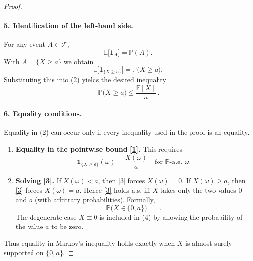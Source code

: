 \begin{proof}
\paragraph{5. Identification of the left‑hand side.}  
For any event \(A\in\mathcal{F}\),
\[
\mathbb{E}\bigl[\mathbf{1}_{A}\bigr]=\mathbb{P}(A).
\]
With \(A=\{X\ge a\}\) we obtain
\[
\mathbb{E}\bigl[\mathbf{1}_{\{X\ge a\}}\bigr]=\mathbb{P}\bigl(X\ge a\bigr).
\]
Substituting this into (2) yields the desired inequality
\[
\boxed{\;\mathbb{P}\bigl(X\ge a\bigr)\le\frac{\mathbb{E}[X]}{a}\;}.
\]

\paragraph{6. Equality conditions.}  
Equality in (2) can occur only if every inequality used in the proof is an
equality.

\begin{enumerate}
\item \textbf{Equality in the pointwise bound \eqref{1}.}  
    This requires
    \begin{equation}
    \mathbf{1}_{\{X\ge a\}}(\omega)=\frac{X(\omega)}{a}
    \quad\text{for }\mathbb{P}\text{-a.e. }\omega. \tag{3}
    \end{equation}
\item \textbf{Solving \eqref{3}.}  
    If \(X(\omega)<a\), then \eqref{3} forces \(X(\omega)=0\).  
    If \(X(\omega)\ge a\), then \eqref{3} forces \(X(\omega)=a\).
    Hence \eqref{3} holds a.s. iff \(X\) takes only the two values \(0\) and
    \(a\) (with arbitrary probabilities).  Formally,
    \begin{equation}
    \mathbb{P}\bigl(X\in\{0,a\}\bigr)=1. \tag{4}
    \end{equation}
    The degenerate case \(X\equiv0\) is included in (4) by allowing the
    probability of the value \(a\) to be zero.
\end{enumerate}
Thus equality in Markov’s inequality holds exactly when \(X\) is almost surely
supported on \(\{0,a\}\).

\end{proof}